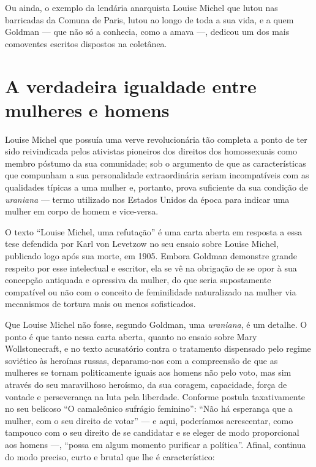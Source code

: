 Ou ainda, o exemplo da lendária
anarquista Louise Michel que lutou nas barricadas da Comuna de Paris,
lutou ao longo de toda a sua vida, e a quem Goldman --- que não só a
conhecia, como a amava ---, dedicou um dos mais comoventes escritos
dispostos na coletânea.

\section{A verdadeira igualdade entre mulheres e homens}

Louise Michel que possuía uma verve
revolucionária tão completa a ponto de ter sido reivindicada pelos
ativistas pioneiros dos direitos dos homossexuais como membro póstumo da
sua comunidade; sob o argumento de que as características que compunham
a sua personalidade extraordinária seriam incompatíveis com as
qualidades típicas a uma mulher e, portanto, prova suficiente da sua
condição de \textit{uraniana} --- termo utilizado nos Estados Unidos da época
para indicar uma mulher em corpo de homem e vice-versa.

O texto ``Louise
Michel, uma refutação'' é uma carta aberta em
resposta a essa tese defendida por Karl von Levetzow no seu ensaio sobre
Louise Michel, publicado logo após sua morte, em 1905. Embora Goldman
demonstre grande respeito por esse intelectual e escritor, ela se vê na
obrigação de se opor à sua concepção antiquada e opressiva da mulher, do
que seria supostamente compatível ou não com o conceito de
feminilidade naturalizado na mulher via mecanismos de tortura mais
ou menos sofisticados.

Que Louise Michel não fosse, segundo Goldman, uma \textit{uraniana}, é
um detalhe. O ponto é que tanto nessa carta aberta, quanto no
ensaio sobre Mary Wollstonecraft, e no texto acusatório contra o
tratamento dispensado pelo regime soviético às heroínas russas,
deparamo-nos com a compreensão de que as mulheres se tornam
politicamente iguais aos homens não pelo voto, mas sim através do seu
maravilhoso heroísmo, da sua coragem, capacidade, força de vontade e
perseverança na luta pela liberdade. Conforme postula taxativamente no
seu belicoso ``O camaleônico sufrágio feminino'': ``Não há
esperança que a mulher, com o seu direito de votar'' --- e aqui,
poderíamos acrescentar, como tampouco com o seu direito de se
candidatar e se eleger de modo proporcional aos homens ---, ``possa em
algum momento purificar a política''. Afinal, continua do modo preciso,
curto e brutal que lhe é característico:

